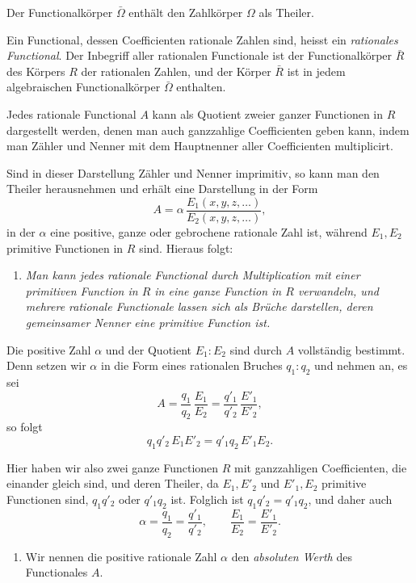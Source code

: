 \documentclass[12pt,a4paper]{article}
\theoremstyle{definition}
\begin{document}
Der Functionalkörper $\bar{\Omega}$ enthält den Zahlkörper $\Omega$ als Theiler.

Ein Functional, dessen Coefficienten rationale Zahlen sind, heisst ein \emph{rationales Functional}. Der Inbegriff aller rationalen Functionale ist der Functionalkörper $\bar{R}$ des Körpers $R$ der rationalen Zahlen, und der Körper $\bar{R}$ ist in jedem algebraischen Functionalkörper $\bar{\Omega}$ enthalten.

Jedes rationale Functional $A$ kann als Quotient zweier ganzer Functionen in $R$ dargestellt werden, denen man auch ganzzahlige Coefficienten geben kann, indem man Zähler und Nenner mit dem Hauptnenner aller Coefficienten multiplicirt.

\newpage

Sind in dieser Darstellung Zähler und Nenner imprimitiv, so kann man den Theiler herausnehmen und erhält eine Darstellung in der Form
\[
A = \alpha\,\frac{E_1(x,y,z,\dots)}{E_2(x,y,z,\dots)},
\]
in der $\alpha$ eine positive, ganze oder gebrochene rationale Zahl ist, während $E_1,E_2$ primitive Functionen in $R$ sind. Hieraus folgt:

\begin{enumerate}[label=\arabic*.]
\item \textit{Man kann jedes rationale Functional durch Multiplication mit einer primitiven Function in $R$ in eine ganze Function in $R$ verwandeln, und mehrere rationale Functionale lassen sich als Brüche darstellen, deren gemeinsamer Nenner eine primitive Function ist.}
\end{enumerate}

Die positive Zahl $\alpha$ und der Quotient $E_1:E_2$ sind durch $A$ vollständig bestimmt. Denn setzen wir $\alpha$ in die Form eines rationalen Bruches $q_1:q_2$ und nehmen an, es sei
\[
A = \frac{q_1}{q_2}\,\frac{E_1}{E_2}
= \frac{q'_1}{q'_2}\,\frac{E'_1}{E'_2},
\]
so folgt
\[
q_1q'_2\,E_1E'_2 = q'_1q_2\,E'_1E_2.
\]

Hier haben wir also zwei ganze Functionen $R$ mit ganzzahligen Coefficienten, die einander gleich sind, und deren Theiler, da $E_1,E'_2$ und $E'_1,E_2$ primitive Functionen sind, $q_1q'_2$ oder $q'_1q_2$ ist. Folglich ist $q_1q'_2=q'_1q_2$, und daher auch
\[
\alpha = \frac{q_1}{q_2} = \frac{q'_1}{q'_2},\qquad
\frac{E_1}{E_2} = \frac{E'_1}{E'_2}.
\]

\begin{enumerate}[label=\arabic*., resume]
\item Wir nennen die positive rationale Zahl $\alpha$ den \emph{absoluten Werth} des Functionales $A$.
\end{enumerate}
\end{document}
